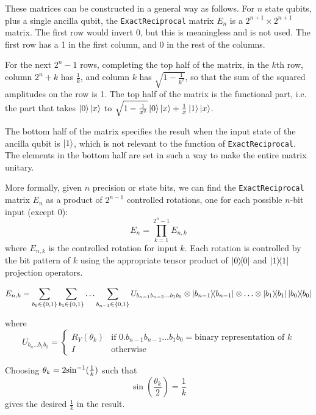 \documentclass[12pt]{extarticle}
\begin{document}
These matrices can be constructed in a general way as follows.
For $n$ state qubits, plus a single ancilla qubit, the \texttt{ExactReciprocal} matrix $E_n$ is a $2^{n+1} \times 2^{n+1}$ matrix.
The first row would invert 0, but this is meaningless and is not used. The first row has a 1 in the first column, and 0 in the rest of the columns.

For the next $2^n-1$ rows, completing the top half of the matrix, in the $k$th row, column $2^n+k$ has $\frac{1}{k}$, and column $k$ has $\sqrt{1-\frac{1}{k^2}}$, so that the sum of the squared amplitudes on the row is 1.
The top half of the matrix is the functional part, i.e. the part that takes $\ket{0}\ket{x}$ to $\sqrt{1-\frac{1}{x^2}}\ket{0}\ket{x} + \frac{1}{x}\ket{1}\ket{x}$.

The bottom half of the matrix specifies the result when the input state of the ancilla qubit is $\ket{1}$, which is not relevant to the function of \texttt{ExactReciprocal}.
The elements in the bottom half are set in such a way to make the entire matrix unitary.

More formally, given $n$ precision or state bits, we can find the \texttt{ExactReciprocal} matrix $E_n$ as a product of $2^{n-1}$ controlled rotations, one for each possible $n$-bit input (except 0):
\[
E_n = \prod_{k=1}^{2^n-1} E_{n,k}
\]
where $E_{n,k}$ is the controlled rotation for input $k$.
Each rotation is controlled by the bit pattern of $k$ using the appropriate tensor product of $\outerproduct{0}$ and $\outerproduct{1}$ projection operators.

\begin{small}
\[
E_{n,k} =
\sum_{b_0\in\{0,1\}} \sum_{b_1\in\{0,1\}} \ldots \sum_{b_{n-1}\in\{0,1\}} U_{b_{n-1}b_{n-2}\ldots b_1b_0} \otimes \outerproduct{b_{n-1}} \otimes \ldots \otimes \outerproduct{b_1} \outerproduct{b_0}
\]
\end{small}

where
\[
U_{b_n\ldots b_1b_0} = \begin{cases}
    R_Y(\theta_k) & \text{if } 0.b_{n-1}b_{n-1}\ldots b_1b_0 = \text{binary representation of } k \\
    I & \text{otherwise}
\end{cases}
\]

Choosing $\theta_k = 2{{\sin}^{-1}}(\frac{1}{k})$ such that
\[
\sin\left(\frac{\theta_k}{2}\right) = \frac{1}{k}
\]
gives the desired $\frac{1}{k}$ in the result.
\end{document}
